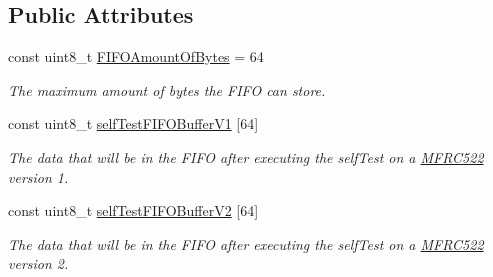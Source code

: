 \subsection*{Public Attributes}
\begin{DoxyCompactItemize}
\item 
\mbox{\label{class_m_f_r_c522_a56c8309a003cf1a5d8479c7783826f8e}} 
const uint8\+\_\+t \mbox{\hyperlink{class_m_f_r_c522_a56c8309a003cf1a5d8479c7783826f8e}{F\+I\+F\+O\+Amount\+Of\+Bytes}} = 64
\begin{DoxyCompactList}\small\item\em The maximum amount of bytes the F\+I\+FO can store. \end{DoxyCompactList}\item 
const uint8\+\_\+t \mbox{\hyperlink{class_m_f_r_c522_a7d19c9869a7fbbe0d9825d5653d6af7b}{self\+Test\+F\+I\+F\+O\+Buffer\+V1}} \mbox{[}64\mbox{]}
\begin{DoxyCompactList}\small\item\em The data that will be in the F\+I\+FO after executing the self\+Test on a \mbox{\hyperlink{class_m_f_r_c522}{M\+F\+R\+C522}} version 1. \end{DoxyCompactList}\item 
const uint8\+\_\+t \mbox{\hyperlink{class_m_f_r_c522_a6973b73a8a922ac09b9d89489bdbc333}{self\+Test\+F\+I\+F\+O\+Buffer\+V2}} \mbox{[}64\mbox{]}
\begin{DoxyCompactList}\small\item\em The data that will be in the F\+I\+FO after executing the self\+Test on a \mbox{\hyperlink{class_m_f_r_c522}{M\+F\+R\+C522}} version 2. \end{DoxyCompactList}\end{DoxyCompactItemize}
